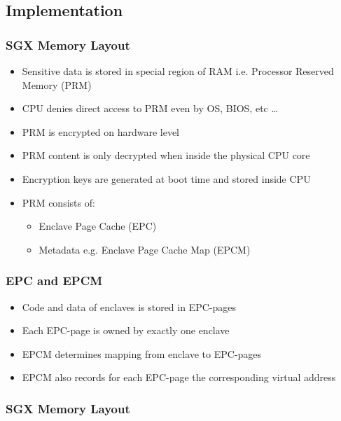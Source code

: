 \subsection{Implementation}

\begin{frame}
    \frametitle{SGX Memory Layout}
    \begin{itemize}[<+->]
        \item Sensitive data is stored in special region of RAM i.e. Processor Reserved Memory (PRM)
        \item CPU denies direct access to PRM even by OS, BIOS, etc \dots
        \item PRM is encrypted on hardware level
        \item PRM content is only decrypted when inside the physical CPU core
        \item Encryption keys are generated at boot time and stored inside CPU
        \item PRM consists of:
        \begin{itemize}
            \item Enclave Page Cache (EPC)
            \item Metadata e.g. Enclave Page Cache Map (EPCM)
        \end{itemize}
    \end{itemize}
\end{frame}

\begin{frame}
    \frametitle{EPC and EPCM}
    \begin{itemize}[<+->]
        \item Code and data of enclaves is stored in EPC-pages
        \item Each EPC-page is owned by exactly one enclave
        \item EPCM determines mapping from enclave to EPC-pages
        \item EPCM also records for each EPC-page the corresponding virtual address
    \end{itemize}
\end{frame}

\begin{frame}
    \frametitle{SGX Memory Layout}
    \centering
\end{frame}

